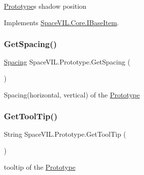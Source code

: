 \mbox{\hyperlink{class_space_v_i_l_1_1_prototype}{Prototype}}\textquotesingle{}s shadow position 



Implements \mbox{\hyperlink{interface_space_v_i_l_1_1_core_1_1_i_base_item}{Space\+V\+I\+L.\+Core.\+I\+Base\+Item}}.

\mbox{\label{class_space_v_i_l_1_1_prototype_a615a4bdc121cb4a4e93d3c25ecb2bb35}} 
\subsubsection{\texorpdfstring{Get\+Spacing()}{GetSpacing()}}
{\footnotesize\ttfamily \mbox{\hyperlink{struct_space_v_i_l_1_1_decorations_1_1_spacing}{Spacing}} Space\+V\+I\+L.\+Prototype.\+Get\+Spacing (\begin{DoxyParamCaption}{ }\end{DoxyParamCaption})}



Spacing(horizontal, vertical) of the \mbox{\hyperlink{class_space_v_i_l_1_1_prototype}{Prototype}} 

\mbox{\label{class_space_v_i_l_1_1_prototype_a87c98f228c5c5f11fcf62d7534054fd6}} 
\subsubsection{\texorpdfstring{Get\+Tool\+Tip()}{GetToolTip()}}
{\footnotesize\ttfamily String Space\+V\+I\+L.\+Prototype.\+Get\+Tool\+Tip (\begin{DoxyParamCaption}{ }\end{DoxyParamCaption})}



tooltip of the \mbox{\hyperlink{class_space_v_i_l_1_1_prototype}{Prototype}} 

\mbox{\label{class_space_v_i_l_1_1_prototype_af033781dfb15abb603274625f90d97de}} 
